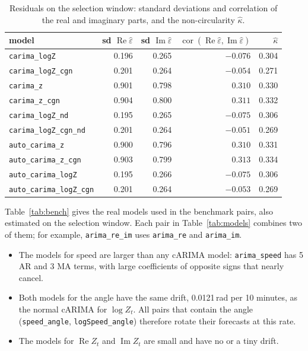 \documentclass[11pt,a4paper]{article}
\newcommand{\code}[1]{\texttt{#1}}
\renewcommand{\Re}{\operatorname{Re}}
\renewcommand{\Im}{\operatorname{Im}}
\begin{document}
\begin{table}[H]
  \centering
  \caption{Residuals on the selection window: standard deviations and correlation of the real and
    imaginary parts, and the non-circularity $\hat\kappa$.}\label{tab:resid}
  \begin{tabular}{lrrrr}
    \toprule
    model & sd $\Re\hat\varepsilon$ & sd $\Im\hat\varepsilon$ & $\operatorname{cor}(\Re\hat\varepsilon,
      \Im\hat\varepsilon)$ & $\hat\kappa$ \\
    \midrule
\texttt{carima\_logZ} & 0.196 & 0.265 & $-0.076$ & 0.304 \\
\texttt{carima\_logZ\_cgn} & 0.201 & 0.264 & $-0.054$ & 0.271 \\
\texttt{carima\_z} & 0.901 & 0.798 & $0.310$ & 0.330 \\
\texttt{carima\_z\_cgn} & 0.904 & 0.800 & $0.311$ & 0.332 \\
\texttt{carima\_logZ\_nd} & 0.195 & 0.265 & $-0.075$ & 0.306 \\
\texttt{carima\_logZ\_cgn\_nd} & 0.201 & 0.264 & $-0.051$ & 0.269 \\
\texttt{auto\_carima\_z} & 0.900 & 0.796 & $0.310$ & 0.331 \\
\texttt{auto\_carima\_z\_cgn} & 0.903 & 0.799 & $0.313$ & 0.334 \\
\texttt{auto\_carima\_logZ} & 0.195 & 0.266 & $-0.075$ & 0.306 \\
\texttt{auto\_carima\_logZ\_cgn} & 0.201 & 0.264 & $-0.053$ & 0.269 \\
    \bottomrule
  \end{tabular}
\end{table}

Table~\ref{tab:bench} gives the real models used in the benchmark pairs, also estimated on the
selection window. Each pair in Table~\ref{tab:models} combines two of them; for example,
\code{arima\_re\_im} uses \code{arima\_re} and \code{arima\_im}.
\begin{itemize}
  \item The models for speed are larger than any cARIMA model: \code{arima\_speed} has 5 AR and 3
    MA terms, with large coefficients of opposite signs that nearly cancel.
  \item Both models for the angle have the same drift, 0.0121\,rad per 10 minutes, as the normal
    cARIMA for $\log Z_t$. All pairs that contain the angle (\code{speed\_angle},
    \code{logSpeed\_angle}) therefore rotate their forecasts at this rate.
  \item The models for $\Re Z_t$ and $\Im Z_t$ are small and have no or a tiny drift.
\end{itemize}
\end{document}

